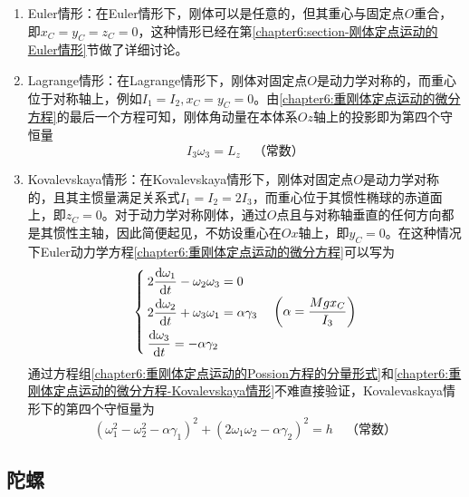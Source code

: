 \begin{enumerate}
\item Euler情形：在Euler情形下，刚体可以是任意的，但其重心与固定点$O$重合，即$x_C=y_C=z_C=0$，这种情形已经在第\ref{chapter6:section-刚体定点运动的Euler情形}节做了详细讨论。

\item Lagrange情形：在Lagrange情形下，刚体对固定点$O$是动力学对称的，而重心位于对称轴上，例如$I_1=I_2, x_C=y_C=0$。由\eqref{chapter6:重刚体定点运动的微分方程}的最后一个方程可知，刚体角动量在本体系$Oz$轴上的投影即为第四个守恒量
\begin{equation}
	I_3\omega_3=L_z\quad \text{（常数）}
\end{equation}

\item Kovalevskaya情形：在Kovalevskaya情形下，刚体对固定点$O$是动力学对称的，且其主惯量满足关系式$I_1=I_2=2I_3$，而重心位于其惯性椭球的赤道面上，即$z_C=0$。对于动力学对称刚体，通过$O$点且与对称轴垂直的任何方向都是其惯性主轴，因此简便起见，不妨设重心在$Ox$轴上，即$y_C=0$。在这种情况下Euler动力学方程\eqref{chapter6:重刚体定点运动的微分方程}可以写为
\begin{equation}
\begin{cases}
	2\dfrac{\mathrm{d} \omega_1}{\mathrm{d} t} - \omega_2 \omega_3 = 0 \\[1.5ex]
	2\dfrac{\mathrm{d} \omega_2}{\mathrm{d} t} + \omega_3 \omega_1 = \alpha\gamma_3 \\[1.5ex]
	\dfrac{\mathrm{d} \omega_3}{\mathrm{d} t} = -\alpha\gamma_2
\end{cases}\left(\alpha=\frac{Mgx_C}{I_3}\right)
\label{chapter6:重刚体定点运动的微分方程-Kovalevskaya情形}
\end{equation}
通过方程组\eqref{chapter6:重刚体定点运动的Possion方程的分量形式}和\eqref{chapter6:重刚体定点运动的微分方程-Kovalevskaya情形}不难直接验证，Kovalevaskaya情形下的第四个守恒量为
\begin{equation}
	(\omega_1^2-\omega_2^2-\alpha\gamma_1)^2+(2\omega_1\omega_2-\alpha\gamma_2)^2=h\quad \text{（常数）}
	\label{chapter6:Kovalevskaya情形的第四个守恒量}
\end{equation}
\end{enumerate}

\subsection{陀螺}\label{chapter6:subsection-陀螺}


